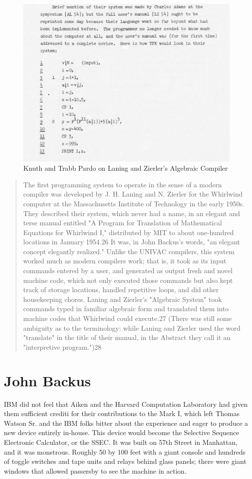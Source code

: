\begin{figure}[h!]
    \centering
    \includegraphics[width=0.5\linewidth]{resource/knuth_pardo_on_laning_zierlers_algebraic_compiler.png}
    \caption{Knuth and Trabb Pardo on Laning and Zierler's Algebraic Compiler}
    \label{fig:knuth-pardo-on-laning-zierler}
\end{figure}

\begin{quotation}
    The first programming system to operate in the sense of a modern compiler was
    developed by J. H. Laning and N. Zierler for the Whirlwind computer at the
    Massachusetts Institute of Technology in the early 1950s. They described their
    system, which never had a name, in an elegant and terse manual entitled "A
    Program for Translation of Mathematical Equations for Whirlwind I," distributed
    by MIT to about one-hundred locations in January 1954.26 It was, in John
    Backus's words, "an elegant concept elegantly realized." Unlike the UNIVAC
    compilers, this system worked much as modern compilers work; that is, it took
    as its input commands entered by a user, and generated as output fresh and
    novel machine code, which not only executed those commands but also kept track
    of storage locations, handled repetitive loops, and did other housekeeping
    chores. Laning and Zierler's "Algebraic System" took commands typed in familiar
    algebraic form and translated them into machine codes that Whirlwind could
    execute.27 (There was still some ambiguity as to the terminology: while Laning
    and Zierler used the word "translate" in the title of their manual, in the
    Abstract they call it an "interpretive program.")28
    \cite{new-history-of-modern-computing}
\end{quotation}

\section{John Backus}

IBM did not feel that Aiken and the Harvard Computation Laboratory had given
them sufficient crediti for their contributions to the Mark I, which left
Thomas Watson Sr. and the IBM folks bitter about the experience and eager to
produce a new device entirely in-house. This device would become the Selective
Sequence Electronic Calculator, or the SSEC. It was built on 57th Street in
Manhattan, and it was monstrous. Roughly 50 by 100 feet with a giant console
and hundreds of toggle switches and tape units and relays behind glass panels;
there were giant windows that allowed passersby to see the machine in action.

